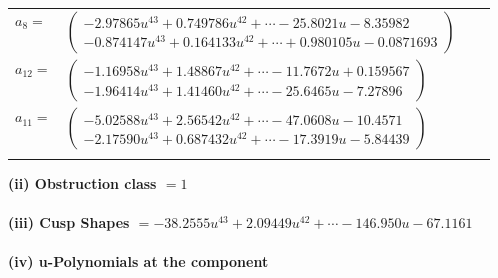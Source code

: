 \documentclass[1p]{elsarticle_modified}
\theoremstyle{definition}
\begin{document}
\begin{tabular}{m{7pt} m{180pt} m{7pt} m{180pt} }
\flushright $a_{8}=$&$\begin{pmatrix}-2.97865 u^{43}+0.749786 u^{42}+\cdots-25.8021 u-8.35982\\-0.874147 u^{43}+0.164133 u^{42}+\cdots+0.980105 u-0.0871693\end{pmatrix}$ \\
\flushright $a_{12}=$&$\begin{pmatrix}-1.16958 u^{43}+1.48867 u^{42}+\cdots-11.7672 u+0.159567\\-1.96414 u^{43}+1.41460 u^{42}+\cdots-25.6465 u-7.27896\end{pmatrix}$ \\
\flushright $a_{11}=$&$\begin{pmatrix}-5.02588 u^{43}+2.56542 u^{42}+\cdots-47.0608 u-10.4571\\-2.17590 u^{43}+0.687432 u^{42}+\cdots-17.3919 u-5.84439\end{pmatrix}$\\&\end{tabular}
\flushleft \textbf{(ii) Obstruction class $= 1$}\\~\\
\flushleft \textbf{(iii) Cusp Shapes $= -38.2555 u^{43}+2.09449 u^{42}+\cdots-146.950 u-67.1161$}\\~\\
\newpage\renewcommand{\arraystretch}{1}
\flushleft \textbf{(iv) u-Polynomials at the component}\newline \\
\end{document}
